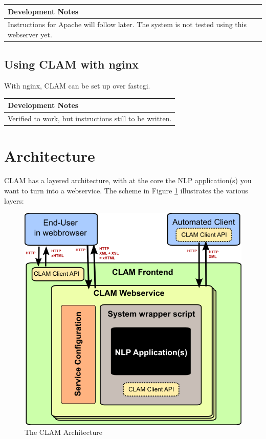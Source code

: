 \documentclass[a4paper,12pt]{report}
\newenvironment{devnotes}
{\newpage
\begin{center}
    \begin{tabular}[h!]{|p{0.8\textwidth}|}
    \hline
    {\bf Development Notes}\\\hline}
{   \\\hline
    \end{tabular}
\end{center}}
\begin{document}
\begin{devnotes}
Instructions for Apache will follow later. The system is not tested using this webserver yet.
\end{devnotes}

\subsection{Using CLAM with nginx}

With nginx, CLAM can be set up over fastcgi. 

\begin{devnotes}
Verified to work, but instructions still to be written.
\end{devnotes}

\section{Architecture}

CLAM has a layered architecture, with at the core the NLP application(s) you want to turn into a webservice. The scheme in Figure \ref{fig:arch} illustrates the various layers: 

\begin{figure}[h]
\begin{center}
\includegraphics[width=130.0mm]{architecture.png}
\end{center}
\caption{The CLAM Architecture}
\label{fig:arch} 
\end{figure}
\end{document}
